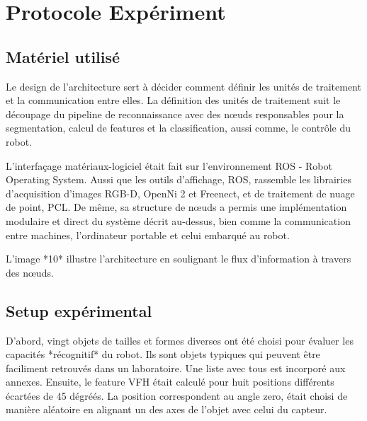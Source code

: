 \section {Protocole Expériment}


\subsection{Matériel utilisé}

Le design de l'architecture sert à décider comment définir les unités de traitement et la communication entre elles. La définition des unités de traitement suit le découpage du pipeline de reconnaissance avec des nœuds responsables pour la segmentation, calcul de features et la classification, aussi comme, le contrôle du robot.

L'interfaçage matériaux-logiciel était fait sur l'environnement ROS -
Robot Operating System. Aussi que les outils d'affichage, ROS, 
rassemble les librairies d'acquisition d'images RGB-D, OpenNi 2 et Freenect, et de traitement de nuage de point, PCL.
De même, sa structure de nœuds a permis une implémentation modulaire et direct du
système décrit au-dessus, bien comme la communication entre machines, l'ordinateur portable et celui embarqué au robot.

L'image *10* illustre l'architecture en soulignant le flux d'information à travers des nœuds.

\subsection{Setup expérimental}
D'abord, vingt objets de tailles et formes diverses ont été choisi pour évaluer les capacités *récognitif* du robot. Ils sont objets typiques qui peuvent être faciliment retrouvés dans un laboratoire. Une liste avec tous est incorporé aux annexes. Ensuite, le feature VFH était calculé pour huit positions différents écartées de 45 dégréés. La position correspondent au angle zero, était choisi de manière aléatoire en alignant un des axes de l'objet avec celui du capteur. 

\begin{figure}[H]
\end{figure}

